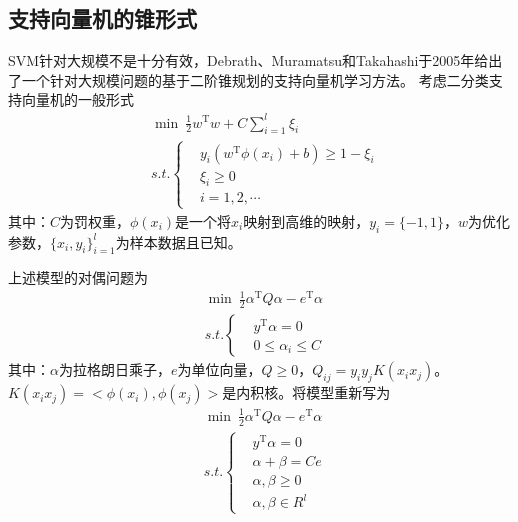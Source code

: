     \subsection{支持向量机的锥形式}
        \par
        SVM针对大规模不是十分有效，Debrath、Muramatsu和Takahashi于2005年给出了一个针对大规模问题的基于二阶锥规划的支持向量机学习方法。
        考虑二分类支持向量机的一般形式
        \begin{align*}
          & \mathop{\min}\  \frac 12 w^\mathrm{T} w+C\mathop{\sum}\limits_{i=1}^l{\xi}_i\\
          & s.t.\left\{
            \begin{aligned}
          & y_i(w^\mathrm{T} \phi(x_i)+b)\geqslant 1-{\xi}_i\\
          & {\xi}_i \geqslant 0\\
          & i=1,2,\cdots
            \end{aligned}
             \right.
        \end{align*}
        其中：$C$为罚权重，$\phi(x_i)$是一个将$x_i$映射到高维的映射，$y_i=\{-1,1\}$，$w$为优化参数，$\{x_i,y_i\}_{i=1}^l$为样本数据且已知。
        \par
        上述模型的对偶问题为
        \begin{align*}
          & \mathop{\min} \ \frac 12 {\alpha}^\mathrm{T} Q{\alpha}-e^\mathrm{T} {\alpha}\\
          & s.t.\left\{
            \begin{aligned}
          & y^\mathrm{T} {\alpha}=0\\
          & 0 \leqslant {\alpha}_i \leqslant C
            \end{aligned}
             \right.
        \end{align*}
        其中：$\alpha$为拉格朗日乘子，$e$为单位向量，$Q \geqslant 0$，$Q_{ij}=y_iy_jK(x_ix_j)$。$K(x_ix_j)=\big<\phi (x_i),\phi(x_j)\big>$是内积核。将模型重新写为
        \begin{align*}
          & \mathop{\min} \ \frac 12 {\alpha}^\mathrm{T} Q{\alpha}-e^\mathrm{T} {\alpha}\\
          & s.t.\left\{
            \begin{aligned}
          & y^\mathrm{T} {\alpha}=0\\
          & {\alpha}+\beta = Ce\\
          & {\alpha},\beta \geqslant 0\\
          & {\alpha},\beta \in R^l
            \end{aligned}
             \right.
        \end{align*}
